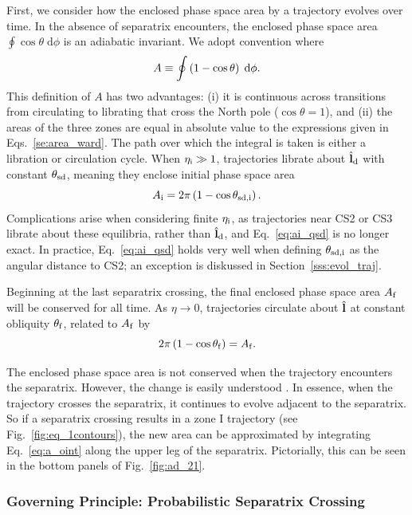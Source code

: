 First, we consider how the enclosed phase space area by a trajectory evolves
over time. In the absence of separatrix encounters, the enclosed phase space
area $\oint \cos\theta \;\mathrm{d}\phi$ is an adiabatic invariant. We adopt
convention where
\begin{equation}
    A \equiv \oint \p{1 - \cos \theta}\;\mathrm{d}\phi.\label{eq:a_oint}
\end{equation}
This definition of $A$ has two advantages: (i) it is continuous across
transitions from circulating to librating that cross the North pole ($\cos
\theta = 1$), and (ii) the areas of the three zones are equal in absolute value
to the expressions given in Eqs.~\eqref{se:area_ward}. The path over which the
integral is taken is either a libration or circulation cycle. When $\eta_{\rm i}
\gg 1$, trajectories librate about $\hat{\boldsymbol{\mathbf{l}}}_{\rm d}$ with constant $\theta_{\rm
sd}$, meaning they enclose initial phase space area
\begin{equation}
    A_{\rm i} = 2\pi\p{1 - \cos \theta_{\rm sd, i}}.\label{eq:ai_qsd}
\end{equation}
Complications arise when considering finite $\eta_{\rm i}$, as trajectories near
CS2 or CS3 librate about these equilibria, rather than $\hat{\boldsymbol{\mathbf{l}}}_{\rm d}$, and
Eq.~\eqref{eq:ai_qsd} is no longer exact. In practice, Eq.~\eqref{eq:ai_qsd}
holds very well when defining $\theta_{\rm sd, i}$ as the angular distance to
CS2; an exception is diskussed in Section~\ref{sss:evol_traj}.

Beginning at the last separatrix crossing, the final enclosed phase space area
$A_{\rm f}$ will be conserved for all time. As $\eta \to 0$, trajectories
circulate about $\hat{\boldsymbol{\mathbf{l}}}$ at constant obliquity $\theta_{\rm f}$, related to
$A_{\rm f}$ by
\begin{equation}
    2\pi\p{1 - \cos \theta_{\rm f}} = A_{\rm f}. \label{eq:qfaf}
\end{equation}

The enclosed phase space area is not conserved when the trajectory encounters
the separatrix. However, the change is easily understood \citep{henrard1982}. In
essence, when the trajectory crosses the separatrix, it continues to evolve
adjacent to the separatrix. So if a separatrix crossing results in a zone I
trajectory (see Fig.~\ref{fig:eq_1contours}), the new area can be approximated
by integrating Eq.~\eqref{eq:a_oint} along the upper leg of the separatrix.
Pictorially, this can be seen in the bottom panels of Fig.~\ref{fig:ad_21}.

\subsubsection{Governing Principle: Probabilistic Separatrix Crossing}

